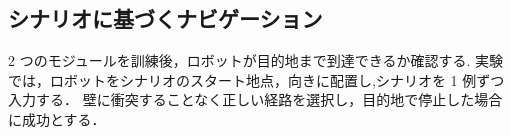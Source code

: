\clearpage
\subsection{シナリオに基づくナビゲーション}
2 つのモジュールを訓練後，ロボットが目的地まで到達できるか確認する.
実験では，ロボットをシナリオのスタート地点，向きに配置し,シナリオを 1 例ずつ入力する．
壁に衝突することなく正しい経路を選択し，目的地で停止した場合に成功とする．